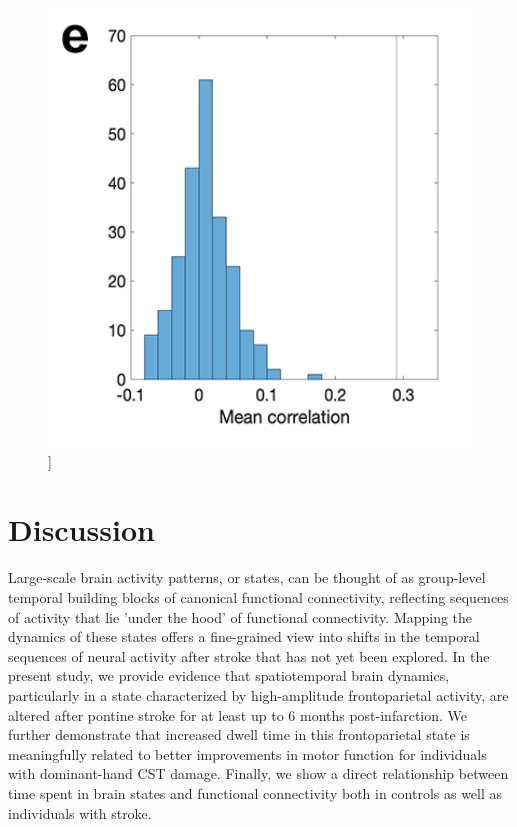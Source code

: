 \documentclass[phd,tocprelim]{cornell}
\renewcommand{\caption}[1]{\singlespacing\hangcaption{#1}\normalspacing}
\begin{document}
\null
\vfill
\clearpage    
    \null
\vfill
\begin{figure}[h!]
		\ContinuedFloat
		\captionsetup{labelformat=adja-page}
    \centering
    \includegraphics[width=1\textwidth]{chapter2/Figure6e.png}
    \caption[]{}
\end{figure}
\null
\vfill
\clearpage    
    \null
\vfill

\section{Discussion}
Large-scale brain activity patterns, or states, can be thought of as group-level temporal building blocks of canonical functional connectivity, reflecting sequences of activity that lie 'under the hood' of functional connectivity. Mapping the dynamics of these states offers a fine-grained view into shifts in the temporal sequences of neural activity after stroke that has not yet been explored. In the present study, we provide evidence that spatiotemporal brain dynamics, particularly in a state characterized by high-amplitude frontoparietal activity, are altered after pontine stroke for at least up to 6 months post-infarction. We further demonstrate that increased dwell time in this frontoparietal state is meaningfully related to better improvements in motor function for individuals with dominant-hand CST damage. Finally, we show a direct relationship between time spent in brain states and functional connectivity both in controls as well as individuals with stroke.
\end{document}
